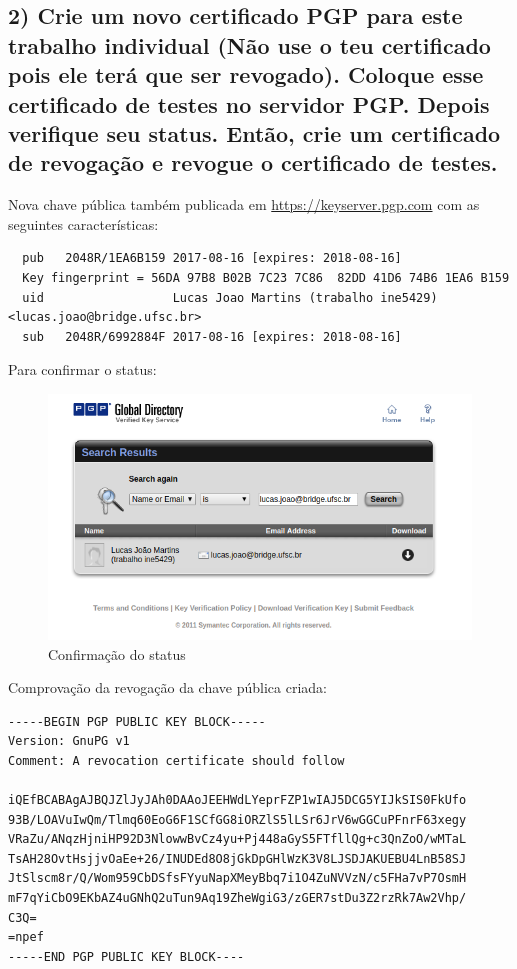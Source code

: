 \documentclass[12pt]{article}
\begin{document}
\subsection*{2) Crie um novo certificado PGP para este trabalho individual (Não use o teu certificado pois ele terá que ser revogado). Coloque esse certificado de testes no servidor PGP. Depois verifique seu status. Então, crie um certificado de revogação e revogue o certificado de testes.}
Nova chave pública também publicada em \url{https://keyserver.pgp.com} com as seguintes características:

\begin{lstlisting}
  pub   2048R/1EA6B159 2017-08-16 [expires: 2018-08-16]
  Key fingerprint = 56DA 97B8 B02B 7C23 7C86  82DD 41D6 74B6 1EA6 B159
  uid                  Lucas Joao Martins (trabalho ine5429) <lucas.joao@bridge.ufsc.br>
  sub   2048R/6992884F 2017-08-16 [expires: 2018-08-16]
\end{lstlisting}

Para confirmar o status:

\begin{figure}[h] %
  \includegraphics[width=\linewidth]{status01}
  \caption{Confirmação do status}
\end{figure}

Comprovação da revogação da chave pública criada:

\begin{lstlisting}
-----BEGIN PGP PUBLIC KEY BLOCK-----
Version: GnuPG v1
Comment: A revocation certificate should follow

iQEfBCABAgAJBQJZlJyJAh0DAAoJEEHWdLYeprFZP1wIAJ5DCG5YIJkSIS0FkUfo
93B/LOAVuIwQm/Tlmq60EoG6F1SCfGG8iORZlS5lLSr6JrV6wGGCuPFnrF63xegy
VRaZu/ANqzHjniHP92D3NlowwBvCz4yu+Pj448aGyS5FTfllQg+c3QnZoO/wMTaL
TsAH28OvtHsjjvOaEe+26/INUDEd8O8jGkDpGHlWzK3V8LJSDJAKUEBU4LnB58SJ
JtSlscm8r/Q/Wom959CbDSfsFYyuNapXMeyBbq7i1O4ZuNVVzN/c5FHa7vP7OsmH
mF7qYiCbO9EKbAZ4uGNhQ2uTun9Aq19ZheWgiG3/zGER7stDu3Z2rzRk7Aw2Vhp/
C3Q=
=npef
-----END PGP PUBLIC KEY BLOCK----
\end{lstlisting}
\end{document}
